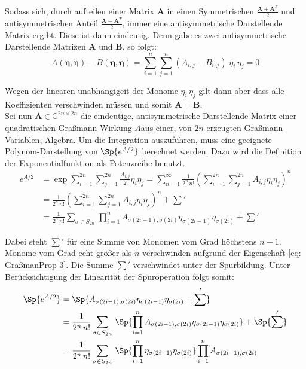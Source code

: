 \noindent Sodass sich, durch aufteilen einer Matrix $\bm{A}$ in einen Symmetrischen $\frac{\bm{A}+\bm{A}^T}{2}$ und antisymmetrischen Anteil $\frac{\bm{A}-\bm{A}^T}{2}$, immer eine antisymmetrische Darstellende Matrix ergibt. Diese ist dann eindeutig. Denn gäbe es zwei antisymmetrische Darstellende Matrizen $\bm{A}$ und $\bm{B}$, so folgt: 
\begin{equation} 
A\left(\bm{\eta}, \bm{\eta}\right)  - B\left(\bm{\eta}, \bm{\eta}\right)  = \sum_{i=1}^n \sum_{j=1}^n (A_{i,j} - B_{i,j})\; \eta_i\, \eta_j = 0 \nonumber
\end{equation}

\noindent Wegen der linearen unabhängigeit der Monome $\eta_i\,\eta_j$ gilt dann aber dass alle Koeffizienten verschwinden müssen und somit $\bm{A}=\bm{B}$. \\
\noindent Sei nun $\bm{A} \in\mathbb{C}^{2n \times 2n}$ die eindeutige, antisymmetrische Darstellende Matrix einer quadratischen Graßmann Wirkung $A$aus einer, von $2n$ erzeugten Graßmann Variablen, Algebra. Um die Integration auszuführen, muss eine geeignete Polynom-Darstellung von $ \Sp{e^{A/2}}$ berechnet werden. Dazu wird die Definition der Exponentialfunktion als Potenzreihe benutzt. 
\begin{align}
e^{A/2} 
&= \exp{ \sum_{i=1}^{2n} \sum_{j=1}^{2n} \frac{A_{i,j}}{2} \eta_i \eta_j } 
= \sum_{n=1}^{\infty} \frac{1}{2^n\,n!} \left(\sum_{i=1}^{2n} \sum_{j=1}^{2n} A_{i,j} \eta_i \eta_j \right)^n  \nonumber \\
& = \frac{1}{2^n\,n!} \left(\sum_{i=1}^{2n} \sum_{j=1}^{2n} A_{i,j} \eta_i \eta_j \right)^n  + \sum ' \nonumber\\
&= \frac{1}{2^n\,n!} \sum_{\sigma \in S_{2n}} \, \prod_{i=1}^n  A_{\sigma(2i-1),\sigma(2i)}\eta_{\sigma(2i-1)}\eta_{\sigma(2i)} + \sum ' \label{eq: exp_polynom}
\end{align}

\noindent Dabei steht $\sum'$ für eine Summe von Monomen vom Grad höchstens $n-1$. Monome vom Grad echt größer als $n$ verschwinden aufgrund der Eigenschaft \eqref{eq: GraßmanProp 3}. Die Summe $\sum'$ verschwindet unter der Spurbildung. Unter Berücksichtigung der Linearität der Spuroperation folgt somit:
\begin{align}
\Sp{e^{A/2}} &= \Sp{A_{\sigma(2i-1),\sigma(2i)}\eta_{\sigma(2i-1)}\eta_{\sigma(2i)} + \sum '} \nonumber \\
&= \frac{1}{2^n\,n!} \sum_{\sigma \in S_{2n}} \, \Sp{ \prod_{i=1}^n  A_{\sigma(2i-1),\sigma(2i)}\eta_{\sigma(2i-1)}\eta_{\sigma(2i)}} + \Sp{\sum'} \nonumber \\
&= \frac{1}{2^n\,n!} \sum_{\sigma \in S_{2n}} \, \Sp{ \prod_{i=1}^n \eta_{\sigma(2i-1)}\eta_{\sigma(2i)}} \prod_{i=1}^n A_{\sigma(2i-1),\sigma(2i)}  \label{eq: PfaffCalc_2} 
\end{align}

